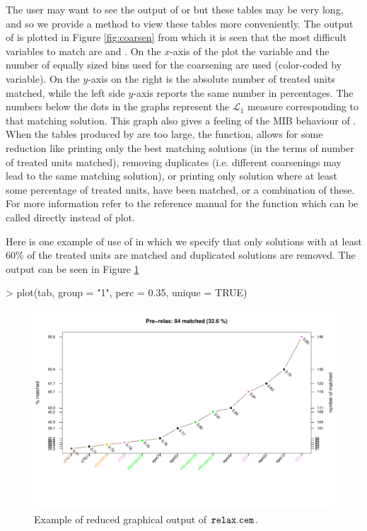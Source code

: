 \documentclass[article]{jss}
\begin{document}
The user may want to see the output of  or
 but these tables may be very long, and so we provide a
method  to view these tables more conveniently.  The output
of  is plotted in Figure \ref{fig:coarsen} from which
it is seen that the most difficult variables to match are 
and .  On the $x$-axis of the plot the variable and
the number of equally sized bins used for the coarsening are used
(color-coded by variable).  On the $y$-axis on the right is the
absolute number of treated units matched, while the left side $y$-axis
reports the same number in percentages.  The numbers below the dots in
the graphs represent the $\mathcal L_1$ measure corresponding to that
matching solution.  This graph also gives a feeling of the MIB
behaviour of . When the tables produced by 
are too large, the  function, allows for some reduction
like printing only the best matching solutions (in the terms of number
of treated units matched), removing duplicates (i.e. different
coarsenings may lead to the same matching solution), or printing only
solution where at least some percentage of treated units, have been
matched, or a combination of these. For more information refer to the
reference manual for the function  which can be
called directly instead of plot.

Here is one example of use of  in which we specify that
only solutions with at least 60\% of the treated units are matched and
duplicated solutions are removed. The output can be seen in Figure
\ref{fig:coarsen2}

\begin{Schunk}
\begin{Sinput}
> plot(tab, group = "1", perc = 0.35, unique = TRUE)
\end{Sinput}
\end{Schunk}
\begin{figure}[Ht]
\begin{center}
\includegraphics[width=1.1\textwidth,   viewport=0 60 700 400,clip]{coarsen2} 
\end{center}
\caption{Example of reduced graphical output of $\tt relax.cem$.}
\label{fig:coarsen2}
\end{figure}
\end{document}
